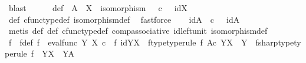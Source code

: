 \begin{isabellebody}
\ blast\isanewline
\ \ \isamarkupfalse%
\ {\isasympsi}\ \ {\isasympsi}{\isacharunderscore}{\kern0pt}def{\isacharcolon}{\kern0pt}\ {\isachardoublequoteopen}{\isasympsi}{\isacharcolon}{\kern0pt}\ A\ {\isasymrightarrow}\ X\ {\isasymand}\ isomorphism{\isacharparenleft}{\kern0pt}{\isasympsi}{\isacharparenright}{\kern0pt}\ {\isasymand}\ {\isacharparenleft}{\kern0pt}{\isasympsi}\ {\isasymcirc}\isactrlsub c\ {\isasymphi}\ {\isacharequal}{\kern0pt}\ id{\isacharparenleft}{\kern0pt}X{\isacharparenright}{\kern0pt}{\isacharparenright}{\kern0pt}{\isachardoublequoteclose}\isanewline
\ \ \ \ \isamarkupfalse%
\ {\isasymphi}{\isacharunderscore}{\kern0pt}def\ cfunc{\isacharunderscore}{\kern0pt}type{\isacharunderscore}{\kern0pt}def\ isomorphism{\isacharunderscore}{\kern0pt}def\ \isamarkupfalse%
\ fastforce\isanewline
\ \ \isamarkupfalse%
\ idA{\isacharcolon}{\kern0pt}\ {\isachardoublequoteopen}{\isasymphi}\ {\isasymcirc}\isactrlsub c\ {\isasympsi}\ {\isacharequal}{\kern0pt}\ id{\isacharparenleft}{\kern0pt}A{\isacharparenright}{\kern0pt}{\isachardoublequoteclose}\isanewline
\ \ \ \ \isamarkupfalse%
\ {\isacharparenleft}{\kern0pt}metis\ {\isasymphi}{\isacharunderscore}{\kern0pt}def\ {\isasympsi}{\isacharunderscore}{\kern0pt}def\ cfunc{\isacharunderscore}{\kern0pt}type{\isacharunderscore}{\kern0pt}def\ comp{\isacharunderscore}{\kern0pt}associative\ id{\isacharunderscore}{\kern0pt}left{\isacharunderscore}{\kern0pt}unit{}\ isomorphism{\isacharunderscore}{\kern0pt}def{\isacharparenright}{\kern0pt}\isanewline
\ \ \isamarkupfalse%
\ f\ \ f{\isacharunderscore}{\kern0pt}def{\isacharcolon}{\kern0pt}\ {\isachardoublequoteopen}f\ {\isacharequal}{\kern0pt}\ {\isacharparenleft}{\kern0pt}eval{\isacharunderscore}{\kern0pt}func\ Y\ X{\isacharparenright}{\kern0pt}\ {\isasymcirc}\isactrlsub c\ {\isacharparenleft}{\kern0pt}{\isasympsi}\ {\isasymtimes}\isactrlsub f\ id{\isacharparenleft}{\kern0pt}Y\isactrlbsup X\isactrlesup {\isacharparenright}{\kern0pt}{\isacharparenright}{\kern0pt}{\isachardoublequoteclose}\ \ f{\isacharunderscore}{\kern0pt}type{\isacharbrackleft}{\kern0pt}type{\isacharunderscore}{\kern0pt}rule{\isacharbrackright}{\kern0pt}{\isacharcolon}{\kern0pt}\ {\isachardoublequoteopen}f{\isacharcolon}{\kern0pt}\ A{\isasymtimes}\isactrlsub c\ {\isacharparenleft}{\kern0pt}Y\isactrlbsup X\isactrlesup {\isacharparenright}{\kern0pt}\ {\isasymrightarrow}\ Y{\isachardoublequoteclose}\ \ fsharp{\isacharunderscore}{\kern0pt}type{\isacharbrackleft}{\kern0pt}type{\isacharunderscore}{\kern0pt}rule{\isacharbrackright}{\kern0pt}{\isacharcolon}{\kern0pt}\ {\isachardoublequoteopen}f\isactrlsup {\isasymsharp}\ {\isacharcolon}{\kern0pt}\ Y\isactrlbsup X\isactrlesup \ {\isasymrightarrow}\ Y\isactrlbsup A\isactrlesup {\isachardoublequoteclose}\isanewline

\end{isabellebody}
